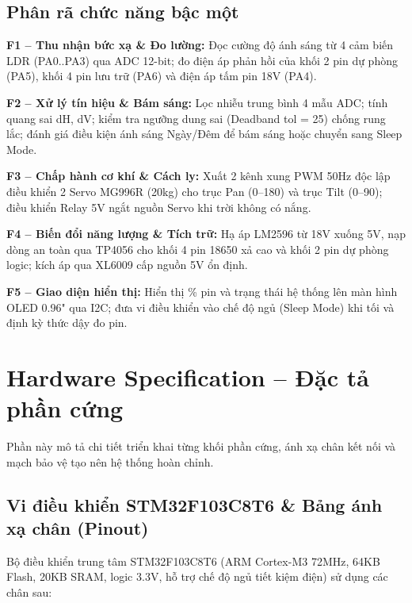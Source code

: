 \documentclass[12pt,a4paper]{report}
\begin{document}
\subsection{Phân rã chức năng bậc một}

\textbf{F1 -- Thu nhận bức xạ \& Đo lường: }Đọc cường độ ánh sáng từ 4 cảm biến LDR (PA0..PA3) qua ADC 12-bit; đo điện áp phản hồi của khối 2 pin dự phòng (PA5), khối 4 pin lưu trữ (PA6) và điện áp tấm pin 18V (PA4).

\textbf{F2 -- Xử lý tín hiệu \& Bám sáng: }Lọc nhiễu trung bình 4 mẫu ADC; tính quang sai dH, dV; kiểm tra ngưỡng dung sai (Deadband tol = 25) chống rung lắc; đánh giá điều kiện ánh sáng Ngày/Đêm để bám sáng hoặc chuyển sang Sleep Mode.

\textbf{F3 -- Chấp hành cơ khí \& Cách ly: }Xuất 2 kênh xung PWM 50Hz độc lập điều khiển 2 Servo MG996R (20kg) cho trục Pan (0\textdegree{}--180\textdegree{}) và trục Tilt (0\textdegree{}--90\textdegree{}); điều khiển Relay 5V ngắt nguồn Servo khi trời không có nắng.

\textbf{F4 -- Biến đổi năng lượng \& Tích trữ: }Hạ áp LM2596 từ 18V xuống 5V, nạp dòng an toàn qua TP4056 cho khối 4 pin 18650 xả cao và khối 2 pin dự phòng logic; kích áp qua XL6009 cấp nguồn 5V ổn định.

\textbf{F5 -- Giao diện hiển thị: }Hiển thị \% pin và trạng thái hệ thống lên màn hình OLED 0.96" qua I2C; đưa vi điều khiển vào chế độ ngủ (Sleep Mode) khi tối và định kỳ thức dậy đo pin.

\section{Hardware Specification -- Đặc tả phần cứng}

Phần này mô tả chi tiết triển khai từng khối phần cứng, ánh xạ chân kết nối và mạch bảo vệ tạo nên hệ thống hoàn chỉnh.

\subsection{Vi điều khiển STM32F103C8T6 \& Bảng ánh xạ chân (Pinout)}

Bộ điều khiển trung tâm STM32F103C8T6 (ARM Cortex-M3 72MHz, 64KB Flash, 20KB SRAM, logic 3.3V, hỗ trợ chế độ ngủ tiết kiệm điện) sử dụng các chân sau:
\end{document}
